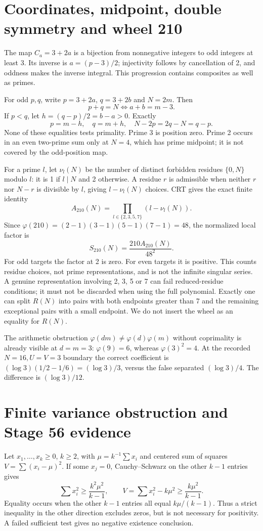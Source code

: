 \documentclass[11pt,a4paper]{article}
\begin{document}
\section{Coordinates, midpoint, double symmetry and wheel 210}
The map $C_a=3+2a$ is a bijection from nonnegative integers to odd integers at least 3. Its inverse is $a=(p-3)/2$; injectivity follows by cancellation of 2, and oddness makes the inverse integral. This progression contains composites as well as primes.

For odd $p,q$, write $p=3+2a$, $q=3+2b$ and $N=2m$. Then
\[
 p+q=N\iff a+b=m-3.
\]
If $p<q$, let $h=(q-p)/2=b-a>0$. Exactly
\[
 p=m-h,\quad q=m+h,\quad N-2p=2q-N=q-p.
\]
None of these equalities tests primality. Prime 3 is position zero. Prime 2 occurs in an even two-prime sum only at $N=4$, which has prime midpoint; it is not covered by the odd-position map.

For a prime $l$, let $\nu_l(N)$ be the number of distinct forbidden residues $\{0,N\}$ modulo $l$: it is 1 if $l\mid N$ and 2 otherwise. A residue $r$ is admissible when neither $r$ nor $N-r$ is divisible by $l$, giving $l-\nu_l(N)$ choices. CRT gives the exact finite identity
\[
 A_{210}(N)=\prod_{l\in\{2,3,5,7\}}(l-\nu_l(N)).
\]
Since $\varphi(210)=(2-1)(3-1)(5-1)(7-1)=48$, the normalized local factor is
\[
 S_{210}(N)=\frac{210A_{210}(N)}{48^2}.
\]
For odd targets the factor at 2 is zero. For even targets it is positive. This counts residue choices, not prime representations, and is not the infinite singular series. A genuine representation involving 2, 3, 5 or 7 can fail reduced-residue conditions; it must not be discarded when using the full polynomial. Exactly one can split $R(N)$ into pairs with both endpoints greater than 7 and the remaining exceptional pairs with a small endpoint. We do not insert the wheel as an equality for $R(N)$.

The arithmetic obstruction $\varphi(dm)\ne\varphi(d)\varphi(m)$ without coprimality is already visible at $d=m=3$: $\varphi(9)=6$, whereas $\varphi(3)^2=4$. At the recorded $N=16,U=V=3$ boundary the correct coefficient is $(\log3)(1/2-1/6)=(\log3)/3$, versus the false separated $(\log3)/4$. The difference is $(\log3)/12$.
\newpage
\section{Finite variance obstruction and Stage 56 evidence}
Let $x_1,\ldots,x_k\ge0$, $k\ge2$, with $\mu=k^{-1}\sum x_i$ and centered sum of squares $V=\sum(x_i-\mu)^2$. If some $x_j=0$, Cauchy--Schwarz on the other $k-1$ entries gives
\[
 \sum x_i^2\ge\frac{k^2\mu^2}{k-1},\qquad
 V=\sum x_i^2-k\mu^2\ge\frac{k\mu^2}{k-1}.
\]
Equality occurs when the other $k-1$ entries all equal $k\mu/(k-1)$. Thus a strict inequality in the other direction excludes zeros, but is not necessary for positivity. A failed sufficient test gives no negative existence conclusion.
\end{document}
